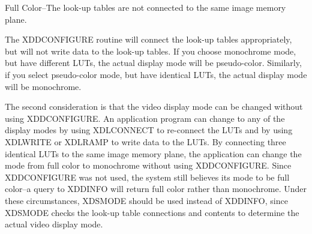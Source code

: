 Full Color--The look-up tables are not connected to the same image memory
plane.

The XDDCONFIGURE routine will connect the look-up tables appropriately,
but will not write data to the look-up tables.  If you choose monochrome
mode, but have different LUTs, the actual display mode will be
pseudo-color.  Similarly, if you select pseudo-color mode, but have
identical LUTs, the actual display mode will be monochrome.

The second consideration is that the video display mode can be changed
without using XDDCONFIGURE.  An application program can change to any
of the display modes by using XDLCONNECT to re-connect the LUTs and by
using XDLWRITE or XDLRAMP to write data to the LUTs.  By connecting three
identical LUTs to the same image memory plane, the application can change
the mode from full color to monochrome without using XDDCONFIGURE.
Since XDDCONFIGURE was not used, the system still believes its mode to
be full color--a query to XDDINFO will return full color rather than
monochrome.  Under these circumstances, XDSMODE should be used instead
of XDDINFO, since XDSMODE checks the look-up table connections and
contents to determine the actual video display mode.
\newpage
